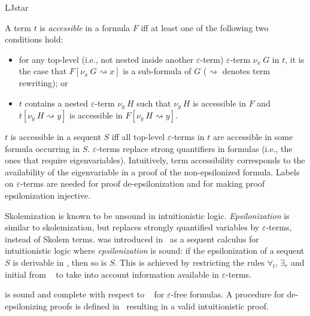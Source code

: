 \begin{entry}{LJstar}
\begin{clarifications}
A term $t$ is \emph{accessible} in a formula $F$ iff at least one of the
following two conditions hold: 
\begin{itemize}
  \item for any top-level (i.e., not nested inside another $\varepsilon$-term)
  $\varepsilon$-term $\nu_x~G$ in $t$, it is the case that $F[\nu_x~G
  \rightsquigarrow x]$ is a sub-formula of $G$ ($\rightsquigarrow$ denotes term
  rewriting); or

  \item $t$ contains a nested $\varepsilon$-term $\nu_y~H$ such that $\nu_y~H$
  is accessible in $F$ and $t[\nu_y~H \rightsquigarrow y]$ is accessible in
  $F[\nu_y~H \rightsquigarrow y]$.
\end{itemize}
$t$ is accessible in a sequent $S$ iff all top-level
$\varepsilon$-terms in $t$ are accessible in some formula occurring in $S$.
%
$\varepsilon$-terms replace strong quantifiers in formulas (i.e., the ones
that require eigenvariables).
Intuitively, term accessibility corresponds to the availability of the
eigenvariable in a proof of the non-epsilonized formula.
%
Labels on $\varepsilon$-terms are needed for proof de-epsilonization
and for making proof epsilonization injective.
\end{clarifications}

\begin{history}
Skolemization is known to be unsound in intuitionistic logic. \emph{Epsilonization} is similar to skolemization, but replaces strongly quantified variables by $\varepsilon$-terms, instead of Skolem terms. \LJstar was introduced in~\cite{Reis2016} as a sequent calculus for
intuitionistic logic where \emph{epsilonization} is sound: if the
epsilonization of a sequent $S$ is derivable in \LJstar, then so is $S$.
%
This is achieved by restricting the rules $\forall_l$, $\exists_r$ and initial
from \LJ~ to take into account information available in
$\varepsilon$-terms.
\end{history}

\begin{technicalities}
\LJstar is sound and complete with respect to \LJ~ for
$\varepsilon$-free formulas. A procedure for de-epsilonizing \LJstar proofs is
defined in~\cite{Reis2016} resulting in a valid intuitionistic proof.
\end{technicalities}

\end{entry}
